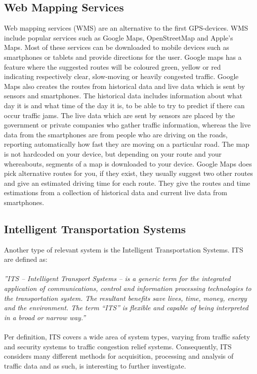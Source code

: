 \subsection*{Web Mapping Services}
Web mapping services (WMS) are an alternative to the first GPS-devices. WMS include popular services such as Google Maps, OpenStreetMap and Apple's Maps. Most of these services can be downloaded to mobile devices such as smartphones or tablets and provide directions for the user. Google maps has a feature where the suggested routes will be coloured green, yellow or red indicating respectively clear, slow-moving or heavily congested traffic.
Google Maps also creates the routes from historical data and live data which is sent by sensors and smartphones\cite{Googleabout}. The historical data includes information about what day it is and what time of the day it is, to be able to try to predict if there can occur traffic jams. The live data which are sent by sensors are placed by the government or private companies who gather traffic information, whereas the live data from the smartphones are from people who are driving on the roads, reporting automatically how fast they are moving on a particular road. The map is not hardcoded on your device, but depending on your route and your whereabouts, segments of a map is downloaded to your device. Google Maps does pick alternative routes for you, if they exist, they usually suggest two other routes and give an estimated driving time for each route. They give the routes and time estimations from a collection of historical data and current live data from smartphones\cite{Ncta}.

\subsection*{Intelligent Transportation Systems}\label{sec:ITS}
Another type of relevant system is the Intelligent Transportation Systems. ITS are defined as:
\\\\
\emph{''ITS – Intelligent Transport Systems – is a generic term for the integrated application of
communications, control and information processing technologies to the transportation system. The
resultant benefits save lives, time, money, energy and the environment. The term “ITS” is flexible and
capable of being interpreted in a broad or narrow way.''}\cite{PIARC0}
\\\\
Per definition, ITS covers a wide area of system types, varying from traffic safety and security systems to traffic congestion relief systems. Consequently, ITS considers many different methods for acquisition, processing and analysis of traffic data and as such, is interesting to further investigate.

